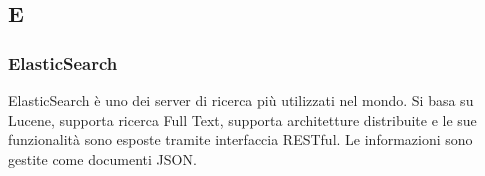 \subsection*{E}
	
    \subsubsection*{ElasticSearch}

        ElasticSearch è uno dei server di ricerca più utilizzati nel mondo.
        Si basa su Lucene, supporta ricerca Full Text, supporta architetture distribuite e le sue funzionalità sono
        esposte tramite interfaccia RESTful.
        Le informazioni sono gestite come documenti JSON.